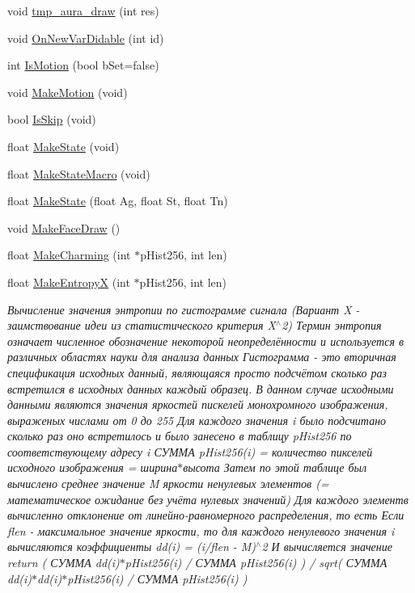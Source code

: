 \begin{DoxyCompactItemize}
void \hyperlink{class_c_v_i_engine_base_a9037ada333cb78e24b8178703c1bace4}{tmp\+\_\+aura\+\_\+draw} (int res)
\item 
void \hyperlink{class_c_v_i_engine_base_afb7d69a59c1067240f248d50d7172ba6}{On\+New\+Var\+Didable} (int id)
\item 
int \hyperlink{class_c_v_i_engine_base_ab9ac11fcc300832a72d0be60be3419e6}{Is\+Motion} (bool b\+Set=false)
\item 
void \hyperlink{class_c_v_i_engine_base_aa31de24bd1b50c4206e8c3a6603985b2}{Make\+Motion} (void)
\item 
bool \hyperlink{class_c_v_i_engine_base_a1bedb5c81d496c6c5496ba88cea82eb7}{Is\+Skip} (void)
\item 
float \hyperlink{class_c_v_i_engine_base_aa77b261660041465a8d3e68a7088dd0d}{Make\+State} (void)
\item 
float \hyperlink{class_c_v_i_engine_base_ab42744ae341c3653c24ae3fd38bc7ceb}{Make\+State\+Macro} (void)
\item 
float \hyperlink{class_c_v_i_engine_base_a835724aef2b6afbc88d5db31e8a13a08}{Make\+State} (float Ag, float St, float Tn)
\item 
void \hyperlink{class_c_v_i_engine_base_a18c5dc58d55a37295b3dd4c451fb86fc}{Make\+Face\+Draw} ()
\item 
float \hyperlink{class_c_v_i_engine_base_a784d5489bb89efa567e207d3539de0da}{Make\+Charming} (int $\ast$p\+Hist256, int len)
\item 
float \hyperlink{class_c_v_i_engine_base_a2617136f50ae63442e88809037ab9ff0}{Make\+Entropy\+X} (int $\ast$p\+Hist256, int len)
\begin{DoxyCompactList}\small\item\em Вычисление значения энтропии по гистограмме сигнала (Вариант X -\/ заимствование идеи из статистического критерия X$^\wedge$2) Термин энтропия означает численное обозначение некоторой неопределённости и используется в различных областях науки для анализа данных Гистограмма -\/ это вторичная спецификация исходных данный, являющаяся просто подсчётом сколько раз встретился в исходных данных каждый образец. В данном случае исходными данными являются значения яркостей пискелей монохромного изображения, выраженых числами от 0 до 255 Для каждого значения i было подсчитано сколько раз оно встретилось и было занесено в таблицу p\+Hist256 по соответствующему адресу i СУММА p\+Hist256(i) = количество пикселей исходного изображения = ширина$\ast$высота Затем по этой таблице был вычислено среднее значение M яркости ненулевых элементов (= математическое ожидание без учёта нулевых значений) Для каждого элементв вычисленно отклонение от линейно-\/равномерного распределения, то есть Если flen -\/ максимальное значение яркости, то для каждого ненулевого значения i вычисляются коэффициенты dd(i) = (i/flen -\/ M)$^\wedge$2 И вычисляется значение return ( СУММА dd(i)$\ast$p\+Hist256(i) / СУММА p\+Hist256(i) ) / sqrt( СУММА dd(i)$\ast$dd(i)$\ast$p\+Hist256(i) / СУММА p\+Hist256(i) ) \end{DoxyCompactList}\item 

\end{DoxyCompactItemize}
